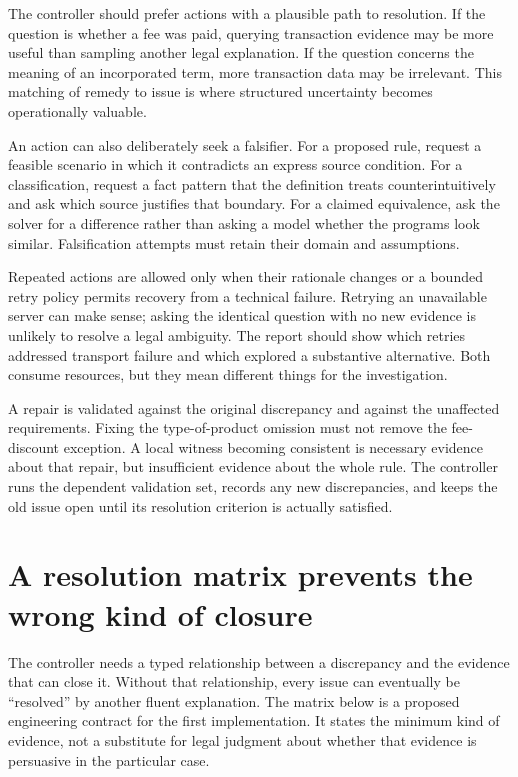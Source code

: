 \documentclass[12pt,a4paper,oneside,openany]{book}
\begin{document}
The controller should prefer actions with a plausible path to resolution. If the
question is whether a fee was paid, querying transaction evidence may be more
useful than sampling another legal explanation. If the question concerns the
meaning of an incorporated term, more transaction data may be irrelevant. This
matching of remedy to issue is where structured uncertainty becomes operationally
valuable.

An action can also deliberately seek a falsifier. For a proposed rule, request a
feasible scenario in which it contradicts an express source condition. For a
classification, request a fact pattern that the definition treats counterintuitively
and ask which source justifies that boundary. For a claimed equivalence, ask the
solver for a difference rather than asking a model whether the programs look
similar. Falsification attempts must retain their domain and assumptions.

Repeated actions are allowed only when their rationale changes or a bounded retry
policy permits recovery from a technical failure. Retrying an unavailable server
can make sense; asking the identical question with no new evidence is unlikely
to resolve a legal ambiguity. The report should show which retries addressed
transport failure and which explored a substantive alternative. Both consume
resources, but they mean different things for the investigation.

A repair is validated against the original discrepancy and against the unaffected
requirements. Fixing the type-of-product omission must not remove the fee-discount
exception. A local witness becoming consistent is necessary evidence about that
repair, but insufficient evidence about the whole rule. The controller runs the
dependent validation set, records any new discrepancies, and keeps the old issue
open until its resolution criterion is actually satisfied.

\section{A resolution matrix prevents the wrong kind of closure}
\label{merge:M06:09}


The controller needs a typed relationship between a discrepancy and the evidence
that can close it. Without that relationship, every issue can eventually be
``resolved'' by another fluent explanation. The matrix below is a proposed
engineering contract for the first implementation. It states the minimum kind of
evidence, not a substitute for legal judgment about whether that evidence is
persuasive in the particular case.
\end{document}
